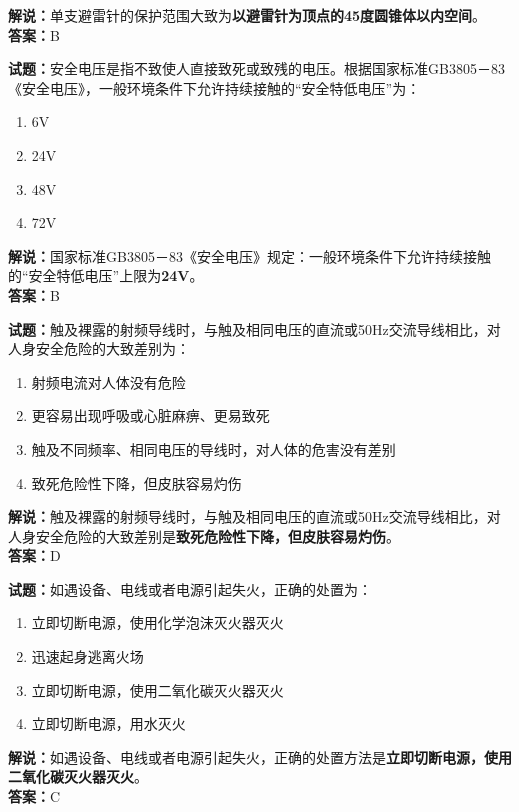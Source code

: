 \documentclass{ctexbook}
\begin{document}
\noindent\textbf{解说：}单支避雷针的保护范围大致为\textbf{以避雷针为顶点的45度圆锥体以内空间}。\\\noindent\textbf{答案：}B%


\bigskip


\noindent\textbf{试题：}安全电压是指不致使人直接致死或致残的电压。根据国家标准GB3805－83《安全电压》，一般环境条件下允许持续接触的“安全特低电压”为：

\begin{enumerate}[leftmargin=3em]
	\item 6V
	\item 24V
	\item 48V
	\item 72V
\end{enumerate}

\noindent\textbf{解说：}国家标准GB3805－83《安全电压》规定：一般环境条件下允许持续接触的“安全特低电压”上限为\textbf{24V}。\\\noindent\textbf{答案：}B%


\bigskip


\noindent\textbf{试题：}触及裸露的射频导线时，与触及相同电压的直流或50Hz交流导线相比，对人身安全危险的大致差别为：
\begin{enumerate}[leftmargin=3em]
	\item 射频电流对人体没有危险
	\item 更容易出现呼吸或心脏麻痹、更易致死
	\item 触及不同频率、相同电压的导线时，对人体的危害没有差别
	\item 致死危险性下降，但皮肤容易灼伤
\end{enumerate}
\noindent\textbf{解说：}触及裸露的射频导线时，与触及相同电压的直流或50Hz交流导线相比，对人身安全危险的大致差别是\textbf{致死危险性下降，但皮肤容易灼伤}。\\\noindent\textbf{答案：}D

\bigskip


\noindent\textbf{试题：}如遇设备、电线或者电源引起失火，正确的处置为：
\begin{enumerate}[leftmargin=3em]
	\item 立即切断电源，使用化学泡沫灭火器灭火
	\item 迅速起身逃离火场
	\item 立即切断电源，使用二氧化碳灭火器灭火
	\item 立即切断电源，用水灭火
\end{enumerate}
\noindent\textbf{解说：}如遇设备、电线或者电源引起失火，正确的处置方法是\textbf{立即切断电源，使用二氧化碳灭火器灭火}。\\\noindent\textbf{答案：}C
\end{document}
